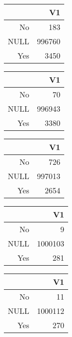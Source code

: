 \bigskip\bigskip
\centering
\begin{tabular}{rr}
  \hline
 & V1 \\ 
  \hline
No & 183 \\ 
  NULL & 996760 \\ 
  Yes & 3450 \\ 
   \hline
\end{tabular}

\bigskip\bigskip
\centering
\begin{tabular}{rr}
  \hline
 & V1 \\ 
  \hline
No &  70 \\ 
  NULL & 996943 \\ 
  Yes & 3380 \\ 
   \hline
\end{tabular}

\bigskip\bigskip
\centering
\begin{tabular}{rr}
  \hline
 & V1 \\ 
  \hline
No & 726 \\ 
  NULL & 997013 \\ 
  Yes & 2654 \\ 
   \hline
\end{tabular}

\bigskip\bigskip
\centering
\begin{tabular}{rr}
  \hline
 & V1 \\ 
  \hline
No &   9 \\ 
  NULL & 1000103 \\ 
  Yes & 281 \\ 
   \hline
\end{tabular}

\bigskip\bigskip
\centering
\begin{tabular}{rr}
  \hline
 & V1 \\ 
  \hline
No &  11 \\ 
  NULL & 1000112 \\ 
  Yes & 270 \\ 
   \hline
\end{tabular}

